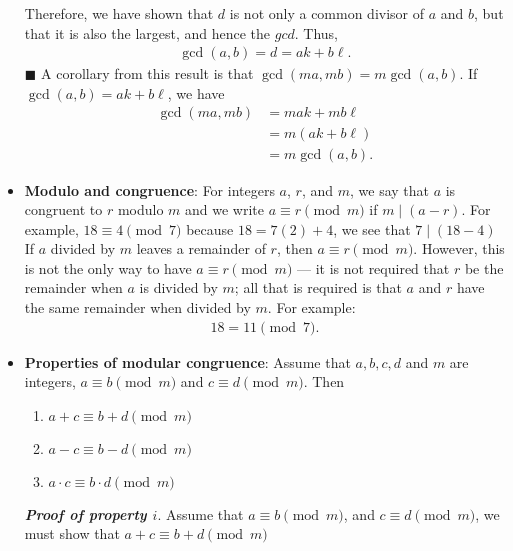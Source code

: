 \documentclass{report}
\begin{document}
\begin{itemize}
{           }
           \bigbreak \noindent 
           Therefore, we have shown that $d$ is not only a common divisor of $a$ and $b$, but that it is also the largest, and hence the $gcd$. Thus,
           \begin{align*}
               \gcd{(a,b)} = d = ak + b \ell
           .\end{align*}
           $\blacksquare$
           \bigbreak \noindent 
           A corollary from this result is that $\gcd{(ma, mb)} = m \gcd{(a,b)}$. If $\gcd{(a,b)} = ak + b\ell$, we have
           \begin{align*}
               \gcd{(ma,mb)} &= mak + mb\ell  \\
                             &=m(ak + b\ell) \\
                             &=m\gcd{(a,b)}
           .\end{align*}
       \item \textbf{Modulo and congruence}: 
           For integers \(a\), \(r\), and \(m\), we say that \(a\) is congruent to \(r\) modulo \(m\) and we write \(a \equiv r \pmod{m}\) if \(m \mid (a - r)\).
           \bigbreak \noindent 
           For example, $18 \equiv  4 \pmod{7}$ because $18 = 7(2) +4 $, we see that $7 \mid (18-4)$
           \bigbreak \noindent 
           If \(a\) divided by \(m\) leaves a remainder of \(r\), then \(a \equiv r \pmod{m}\). However, this is not the only way to have \(a \equiv r \pmod{m}\) — it is not required that \(r\) be the remainder when \(a\) is divided by \(m\); all that is required is that \(a\) and \(r\) have the same remainder when divided by \(m\). For example:
           \begin{align*}
               18 =11 \pmod{7}
           .\end{align*}
        \item \textbf{Properties of modular congruence}: Assume that $a, b, c, d$
            and $m$ are integers, $a \equiv b \pmod{m}$ and $c \equiv d\pmod{m}$. Then
            \begin{enumerate}[label=(\roman*)]
                \item $a + c  \equiv b + d \pmod{m} $ 
                \item $a - c  \equiv b - d \pmod{m} $ 
                \item $a \cdot  c  \equiv b \cdot  d \pmod{m} $ 
            \end{enumerate}
            \bigbreak \noindent 
            \textbf{\textit{Proof of property $i$}}. Assume that $a \equiv b \pmod{m}$, and $c \equiv d \pmod{m}$, we must show that $a + c \equiv b + d \pmod{m}$

\end{itemize}
\end{document}
